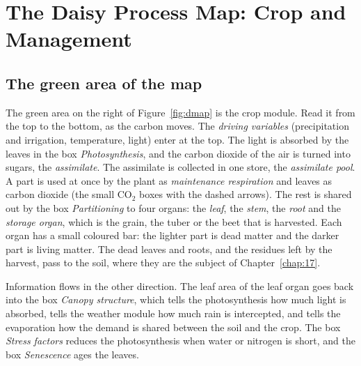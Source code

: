 \chapter{The Daisy Process Map: Crop and Management}\label{chap:16}
\label{ch:map2}
\section{The green area of the map}
The green area on the right of Figure~\ref{fig:dmap} is the crop module. Read it from the top to the bottom, as the carbon moves. The \emph{driving variables} (precipitation and irrigation, temperature, light) enter at the top. The light is absorbed by the leaves in the box \emph{Photosynthesis}, and the carbon dioxide of the air is turned into sugars, the \emph{assimilate}. The assimilate is collected in one store, the \emph{assimilate pool}. A part is used at once by the plant as \emph{maintenance respiration} and leaves as carbon dioxide (the small $\mathrm{CO_2}$ boxes with the dashed arrows). The rest is shared out by the box \emph{Partitioning} to four organs: the \emph{leaf}, the \emph{stem}, the \emph{root} and the \emph{storage organ}, which is the grain, the tuber or the beet that is harvested. Each organ has a small coloured bar: the lighter part is dead matter and the darker part is living matter. The dead leaves and roots, and the residues left by the harvest, pass to the soil, where they are the subject of Chapter~\ref{chap:17}.

\par\noindent Information flows in the other direction. The leaf area of the leaf organ goes back into the box \emph{Canopy structure}, which tells the photosynthesis how much light is absorbed, tells the weather module how much rain is intercepted, and tells the evaporation how the demand is shared between the soil and the crop. The box \emph{Stress factors} reduces the photosynthesis when water or nitrogen is short, and the box \emph{Senescence} ages the leaves.

